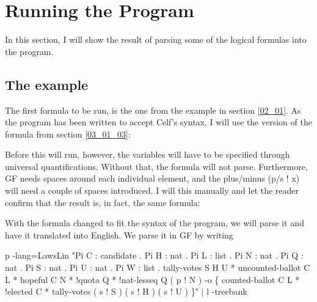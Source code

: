\section{Running the Program}
\label{04_03}

In this section, I will show the result of parsing some of the logical formulas into the program.

\subsection{The example}

The first formula to be run, is the one from the example in section \ref{02_01}. As the program has been written to accept Celf's syntax, I will use the version of the formula from section \ref{03_01_03}:

\begin{texto2}
\end{texto2}

Before this will run, however, the variables will have to be specified through universal quantifications. Without that, the formula will not parse. Furthermore, GF needs spaces around each individual element, and the plus/minus (p/s ! x) will need a couple of spaces introduced. I will this manually and let the reader confirm that the result is, in fact, the same formula:

\begin{texto2}
\end{texto2}

With the formula changed to fit the syntax of the program, we will parse it and have it translated into English. We parse it in GF by writing
\begin{texto2}
p -lang=LawsLin "Pi C : candidate . Pi H : nat . Pi L : list . Pi N : nat . Pi Q : nat . Pi S : nat . Pi U : nat . Pi W : list . tally-votes S H U * uncounted-ballot C L * hopeful C N * !quota Q * !nat-lesseq Q ( p ! N ) -o \{ counted-ballot C L * !elected C * tally-votes ( s ! S ) ( s ! H ) ( s ! U ) \}" $|$ l -treebank
\end{texto2}

